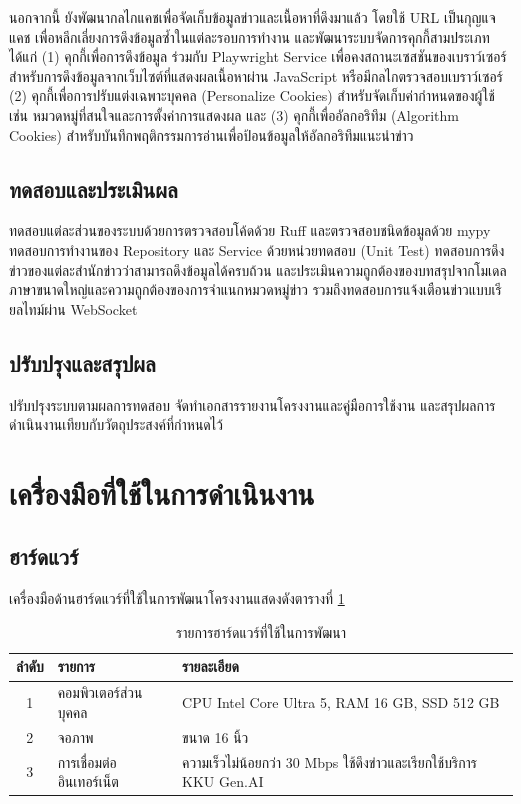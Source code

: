 นอกจากนี้ ยังพัฒนากลไกแคชเพื่อจัดเก็บข้อมูลข่าวและเนื้อหาที่ดึงมาแล้ว โดยใช้ URL เป็นกุญแจแคช เพื่อหลีกเลี่ยงการดึงข้อมูลซ้ำในแต่ละรอบการทำงาน และพัฒนาระบบจัดการคุกกี้สามประเภท ได้แก่ (1) คุกกี้เพื่อการดึงข้อมูล ร่วมกับ Playwright Service เพื่อคงสถานะเซสชันของเบราว์เซอร์สำหรับการดึงข้อมูลจากเว็บไซต์ที่แสดงผลเนื้อหาผ่าน JavaScript หรือมีกลไกตรวจสอบเบราว์เซอร์ (2) คุกกี้เพื่อการปรับแต่งเฉพาะบุคคล (Personalize Cookies) สำหรับจัดเก็บค่ากำหนดของผู้ใช้ เช่น หมวดหมู่ที่สนใจและการตั้งค่าการแสดงผล และ (3) คุกกี้เพื่ออัลกอริทึม (Algorithm Cookies) สำหรับบันทึกพฤติกรรมการอ่านเพื่อป้อนข้อมูลให้อัลกอริทึมแนะนำข่าว

\subsection{ทดสอบและประเมินผล}

ทดสอบแต่ละส่วนของระบบด้วยการตรวจสอบโค้ดด้วย Ruff และตรวจสอบชนิดข้อมูลด้วย mypy ทดสอบการทำงานของ Repository และ Service ด้วยหน่วยทดสอบ (Unit Test) ทดสอบการดึงข่าวของแต่ละสำนักข่าวว่าสามารถดึงข้อมูลได้ครบถ้วน และประเมินความถูกต้องของบทสรุปจากโมเดลภาษาขนาดใหญ่และความถูกต้องของการจำแนกหมวดหมู่ข่าว รวมถึงทดสอบการแจ้งเตือนข่าวแบบเรียลไทม์ผ่าน WebSocket

\subsection{ปรับปรุงและสรุปผล}

ปรับปรุงระบบตามผลการทดสอบ จัดทำเอกสารรายงานโครงงานและคู่มือการใช้งาน และสรุปผลการดำเนินงานเทียบกับวัตถุประสงค์ที่กำหนดไว้

\section{เครื่องมือที่ใช้ในการดำเนินงาน}

\subsection{ฮาร์ดแวร์}

เครื่องมือด้านฮาร์ดแวร์ที่ใช้ในการพัฒนาโครงงานแสดงดังตารางที่ \ref{tab:hardware}

\begin{table}[H]
\centering
\caption{รายการฮาร์ดแวร์ที่ใช้ในการพัฒนา}
\label{tab:hardware}
\begin{tabular}{|c|l|p{6.5cm}|}
\hline
\textbf{ลำดับ} & \textbf{รายการ} & \textbf{รายละเอียด} \\
\hline
1 & คอมพิวเตอร์ส่วนบุคคล & CPU Intel Core Ultra 5, RAM 16 GB, SSD 512 GB \\ \hline
2 & จอภาพ & ขนาด 16 นิ้ว \\ \hline
3 & การเชื่อมต่ออินเทอร์เน็ต & ความเร็วไม่น้อยกว่า 30 Mbps ใช้ดึงข่าวและเรียกใช้บริการ KKU Gen.AI \\
\hline
\end{tabular}
\end{table}

